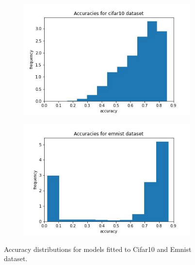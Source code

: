 \documentclass{article} %
\begin{document}
\begin{figure}
    \begin{subfigure}{.5\textwidth}
        \centering
        \includegraphics[width=.8\linewidth]{cifar10/accuracy_distribution.jpg}
        \label{fig:accuracy_distribution_cifar10}
    \end{subfigure}%
    \begin{subfigure}{.5\textwidth}
        \centering
        \includegraphics[width=.8\linewidth]{emnist/accuracy_distribution.jpg}
        \label{fig:accuracy_distribution_emnist}
    \end{subfigure}
    \caption{Accuracy distributions for models fitted to Cifar10 and Emnist dataset.}
    \label{fig:acc_distributions}
\end{figure}
\end{document}
